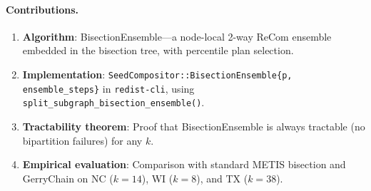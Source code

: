 \paragraph{Contributions.}
\begin{enumerate}
  \item \textbf{Algorithm}: BisectionEnsemble---a node-local 2-way ReCom
        ensemble embedded in the bisection tree, with percentile plan selection.
  \item \textbf{Implementation}: \texttt{SeedCompositor::BisectionEnsemble\{p, ensemble\_steps\}}
        in \texttt{redist-cli}, using \texttt{split\_subgraph\_bisection\_ensemble()}.
  \item \textbf{Tractability theorem}: Proof that BisectionEnsemble is always
        tractable (no bipartition failures) for any $k$.
  \item \textbf{Empirical evaluation}: Comparison with standard METIS bisection
        and GerryChain on NC ($k=14$), WI ($k=8$), and TX ($k=38$).
\end{enumerate}
